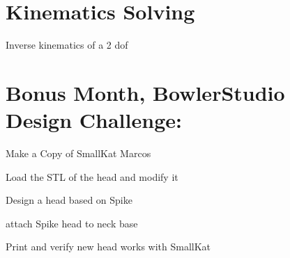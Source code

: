 \documentclass{article}
\begin{document}
\section{Kinematics Solving}
\begin{todolist}
	\item Inverse kinematics of a 2 dof 
\end{todolist}





\newpage
\section{Bonus Month, BowlerStudio Design Challenge:}
\begin{todolist}
	\item Make a Copy of SmallKat Marcos
	\item Load the STL of the head and modify it
	\item Design a head based on Spike
	\item attach Spike head to neck base
	\item Print and verify new head works with SmallKat
\end{todolist}

\newpage

\end{document}
